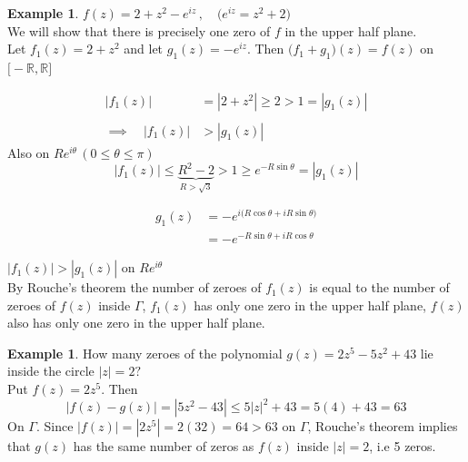 \documentclass[11pt,a4paper]{article}
\theoremstyle{definition}
\newtheorem{example}[thm]{Example}
\begin{document}
\begin{example}
$f(z) = 2 + z^2 - e^{iz}\,, \quad  \Big( e^{iz} = z^2 + 2\Big)$\\

We will show that there is precisely one zero of $f$ in the upper half plane.\\


Let $f_1(z)  = 2 + z^2 $ and let $g_1(z) = -e^{iz}$. Then $\big(f_1 + g_1\big)(z) = f(z)$ on $\big[-\mathbb{R},\mathbb{R}\big]$

\begin{align*}
\left|f_1(z)\right| & = \left|2 + z^2\right|
 \geq 2 > 1 = \left|g_1(z)\right|\\\\
\implies \quad \left|f_1(z)\right| & > \left|g_1(z)\right|
\end{align*}
Also on $Re^{i\theta}\, (0\leq \theta \leq \pi)$
$$\left|f_1(z)\right|\leq \underbrace{R^2 - 2}_{R>\sqrt{3}}> 1 \geq e^{-R\sin \theta} = \left|g_1(z)\right|$$

\begin{align*}
g_1(z) & = -e^{i\big(R\cos \theta + iR\sin \theta\big)}\\
& = -e^{-R\sin \theta + iR\cos \theta}
\end{align*}

$\left|f_1(z)\right| > \left|g_1(z)\right|$ on $ Re^{i\theta}$\\
By Rouche's theorem the number of zeroes of $f_1(z)$ is equal to the number of zeroes of $f(z)$ inside $\Gamma$, $f_1(z)$ has only one zero in the upper half plane, $f(z)$ also has only one zero in the upper half plane.
\end{example}

\begin{example}
How many zeroes of the polynomial $g(z) = 2z^5 - 5z^2 + 43$ lie inside the circle $\left|z\right| = 2?$\\

Put $f(z) = 2z^5$. Then
$$\left|f(z) - g(z)\right| = \left|5z^2 - 43\right|\leq 5\left|z\right|^2 + 43 = 5(4) + 43 = 63$$
On $\Gamma$. Since $\left|f(z)\right| = \left|2z^5\right| = 2(32) = 64 > 63$ on $\Gamma$, Rouche's theorem implies that $g(z)$ has the same number of zeros as $f(z)$ inside $\left|z\right| = 2$, i.e 5 zeros.
\end{example}
\end{document}
